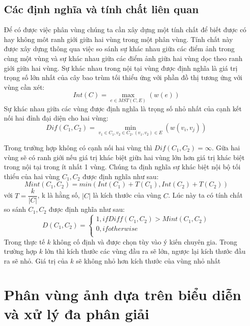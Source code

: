 \documentclass[12pt,oneside,a4]{report}
\begin{document}
\subsection{Các định nghĩa và tính chất liên quan}
Để có được việc phân vùng chúng ta cần xây dựng một tính chất để biết được có hay không môt ranh giới giữa hai vùng trong một phân vùng. Tính chất này được xây dựng thông qua việc so sánh sự khác nhau giữa các điểm ảnh trong cùng một vùng và sự khác nhau giữa các điểm ảnh giữa hai vùng dọc theo ranh giới giữa hai vùng.
Sự khác nhau trong nội tại vùng được định nghĩa là giá trị trọng số lớn nhất của cây bao trùm tối thiểu ứng với phần đồ thị tương ứng với vùng cần xét:
\begin{equation}
Int(C)=\max_{e\in MST(C,E)}(w(e))
\end{equation}
Sự khác nhau giữa các vùng được định nghĩa là trọng số nhỏ nhất của cạnh kết nối hai đỉnh đại diện cho hai vùng:
\begin{equation}
Dif(C_1,C_2)=\min_{v_1\in C_1, v_2 \in C_2,(v_1, v_2) \in E}(w(v_i, v_j))
\end{equation}

Trong trường hợp không có cạnh nối hai vùng thì $Dif(C_1,C_2)= \infty$. Gữa hai vùng sẽ có ranh giới nếu giá trị khác biệt giữa hai vùng lớn hơn giá trị khác biệt trong nội tại trong ít nhất 1 vùng. 
Chúng ta định nghĩa  sự khác biệt nội bộ tối thiểu của hai vùng $C_1, C_2$ được định nghĩa như sau: 
\begin{equation}
Mint(C_1, C_2)= min(Int(C_1)+T(C_1),Int(C_2)+T(C_2))
\end{equation}
với $T=\dfrac{k}{|C|}$, k là hằng số, $|C|$ là kích thước của vùng $C$. Lúc này ta có tính chất so sánh $C_1, C_2$  được định nghĩa như sau:
\begin{equation}
D(C_1, C_2)=
\begin{cases}
 1, if Diff(C_1, C_2)>Mint(C_1, C_2)\\
 0, if otherwise\\
   \end{cases}
\end{equation}
Trong thực tế $k$ không cố định và được chọn tùy vào ý kiến chuyên gia. Trong trường hợp $ k$ lớn thì kích thước các vùng đầu ra sẽ lớn, ngược lại kích thước đầu ra sẽ nhỏ. Giá trị của $k$ sẽ không nhỏ hơn kích thước  của vùng nhỏ nhất
\section{Phân vùng ảnh dựa trên biểu diễn và xử lý đa phân giải}
\end{document}
